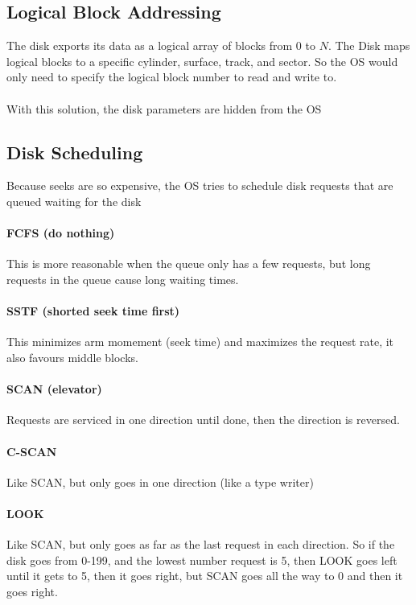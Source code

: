 \documentclass{article}
\begin{document}
\subsection{Logical Block Addressing}

The disk exports its data as a logical array of blocks from 0 to $N$. The Disk maps logical blocks to a specific cylinder, surface, track, and sector. So the OS would only need to specify the logical block number to read and write to.
\\
\\
With this solution, the disk parameters are hidden from the OS

\subsection{Disk Scheduling}

Because seeks are so expensive, the OS tries to schedule disk requests that are queued waiting for the disk

\paragraph{FCFS (do nothing)} This is more reasonable when the queue only has a few requests, but long requests in the queue cause long waiting times.

\paragraph{SSTF (shorted seek time first)} This minimizes arm momement (seek time) and maximizes the request rate, it also favours middle blocks.

\paragraph{SCAN (elevator)} Requests are serviced in one direction until done, then the direction is reversed.

\paragraph{C-SCAN} Like SCAN, but only goes in one direction (like a type writer)

\paragraph{LOOK} Like SCAN, but only goes as far as the last request in each direction. So if the disk goes from 0-199, and the lowest number request is 5, then LOOK goes left until it gets to 5, then it goes right, but SCAN goes all the way to 0 and then it goes right.
\end{document}
